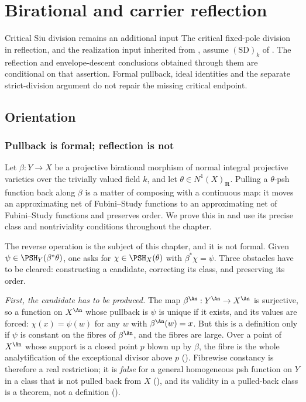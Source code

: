 \chapter{Birational and carrier reflection}
\label{chap:bj-reflection}

\begin{warning}{Critical Siu division remains an additional input}
\label{warn:ch39-siu-dependency}
The critical fixed-pole division in reflection, and the realization
input inherited from , assume
$\mathrm{(SD)}_k$ of . The reflection and
envelope-descent conclusions obtained through them are conditional on that
assertion. Formal pullback, ideal identities and the separate strict-division
argument do not repair the missing critical endpoint.
\end{warning}

\section{Orientation}
\label{sec:ch39-orientation}

\subsection{Pullback is formal; reflection is not}
\label{sec:ch39-what}

Let $\beta:Y\to X$ be a projective birational morphism of normal integral
projective varieties over the trivially valued field $k$, and let
$\theta\in N^1(X)_{\mathbf R}$.  Pulling a $\theta$-psh function back
along $\beta$ is a matter of composing with a continuous map: it moves an
approximating net of Fubini--Study functions to an approximating net of
Fubini--Study functions and preserves order.  We prove this in
 and use its precise class and nontriviality
conditions throughout the chapter.

The reverse operation is the subject of this chapter, and it is not formal.
Given $\psi\in\PSH_Y(\beta^*\theta)$, one asks for
$\chi\in\PSH_X(\theta)$ with $\beta^*\chi=\psi$.  Three obstacles have to
be cleared: constructing a candidate, correcting its class, and preserving
its order.

\emph{First, the candidate has to be produced.}  The map
$\beta^{\An}:Y^{\An}\to X^{\An}$ is surjective, so a function on
$X^{\An}$ whose pullback is $\psi$ is unique if it exists, and its values
are forced: $\chi(x)=\psi(w)$ for any $w$ with $\beta^{\An}(w)=x$.  But
this is a definition only if $\psi$ is constant on the fibres of
$\beta^{\An}$, and the fibres are large.  Over a point of $X^{\An}$ whose
support is a closed point $p$ blown up by $\beta$, the fibre is the whole
analytification of the exceptional divisor above $p$
().  Fibrewise constancy is therefore a real
restriction; it is \emph{false} for a general homogeneous psh function on
$Y$ in a class that is not pulled back from $X$
(), and its validity in a pulled-back class
is a theorem, not a definition ().

